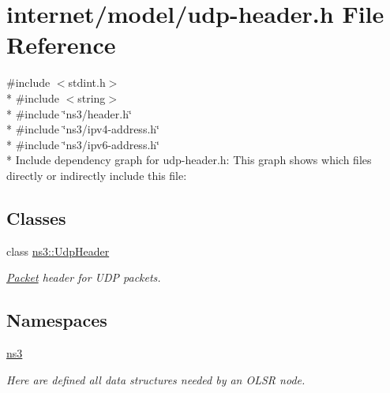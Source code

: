 \hypertarget{udp-header_8h}{}\section{internet/model/udp-\/header.h File Reference}
\label{udp-header_8h}
{\ttfamily \#include $<$stdint.\+h$>$}\\*
{\ttfamily \#include $<$string$>$}\\*
{\ttfamily \#include \char`\"{}ns3/header.\+h\char`\"{}}\\*
{\ttfamily \#include \char`\"{}ns3/ipv4-\/address.\+h\char`\"{}}\\*
{\ttfamily \#include \char`\"{}ns3/ipv6-\/address.\+h\char`\"{}}\\*
Include dependency graph for udp-\/header.h\+:
This graph shows which files directly or indirectly include this file\+:
\subsection*{Classes}
\begin{DoxyCompactItemize}
\item 
class \hyperlink{classns3_1_1UdpHeader}{ns3\+::\+Udp\+Header}
\begin{DoxyCompactList}\small\item\em \hyperlink{classns3_1_1Packet}{Packet} header for U\+DP packets. \end{DoxyCompactList}\end{DoxyCompactItemize}
\subsection*{Namespaces}
\begin{DoxyCompactItemize}
\item 
 \hyperlink{namespacens3}{ns3}
\begin{DoxyCompactList}\small\item\em Here are defined all data structures needed by an O\+L\+SR node. \end{DoxyCompactList}\end{DoxyCompactItemize}

